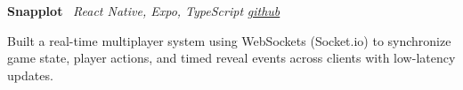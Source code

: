     \hspace{0.5em} \textbf{Snapplot} \textbar \  \textit{React Native, Expo, TypeScript}
\hfill \textit{\href{https://github.com/and-yliu/snapplot}{github}}
    \vspace{0.10 cm}
    \begin{onecolentry}
        \begin{highlights}
            \item Built a real-time multiplayer system using WebSockets (Socket.io) to synchronize game state, player actions, and timed reveal events across clients with low-latency updates.
        \end{highlights}
    \end{onecolentry}
    \vspace{0.10 cm}

